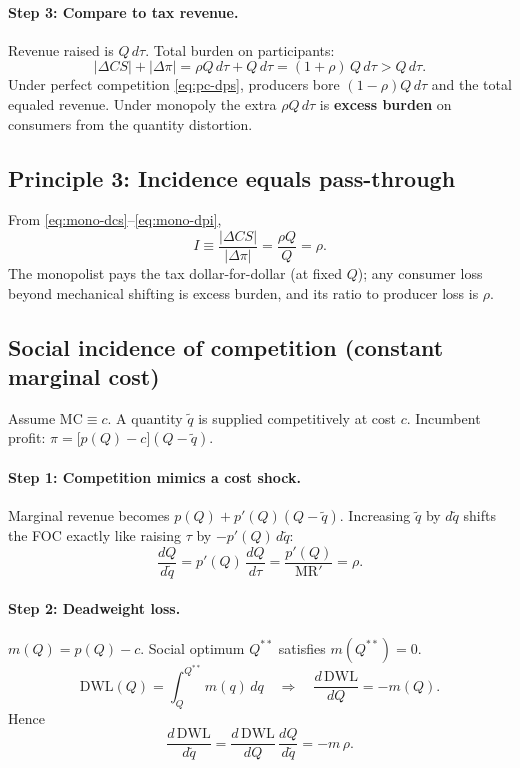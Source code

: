 \documentclass[11pt]{article}
\begin{document}
\paragraph{Step 3: Compare to tax revenue.}
Revenue raised is $Q\,d\tau$.  Total burden on participants:
\[
  |\Delta CS| + |\Delta\pi|
  = \rho Q\,d\tau + Q\,d\tau
  = (1+\rho)\,Q\,d\tau
  > Q\,d\tau.
\]
Under perfect competition \eqref{eq:pc-dps}, producers bore
$(1-\rho)Q\,d\tau$ and the total equaled revenue.  Under monopoly the
extra $\rho Q\,d\tau$ is \textbf{excess burden} on consumers from the
quantity distortion.

\subsection{Principle 3: Incidence equals pass-through}

From \eqref{eq:mono-dcs}--\eqref{eq:mono-dpi},
\[
  I \equiv \frac{|\Delta CS|}{|\Delta\pi|}
  = \frac{\rho Q}{Q}
  = \rho.
\]
The monopolist pays the tax dollar-for-dollar (at fixed $Q$); any consumer
loss beyond mechanical shifting is excess burden, and its ratio to producer
loss is $\rho$.

\subsection{Social incidence of competition (constant marginal cost)}

Assume $\mathrm{MC} \equiv c$.  A quantity $\tilde q$ is supplied
competitively at cost $c$.  Incumbent profit:
$\pi = \bigl[p(Q) - c\bigr](Q - \tilde q)$.

\paragraph{Step 1: Competition mimics a cost shock.}
Marginal revenue becomes $p(Q) + p'(Q)(Q - \tilde q)$.  Increasing
$\tilde q$ by $d\tilde q$ shifts the FOC exactly like raising $\tau$ by
$-p'(Q)\,d\tilde q$:
\[
  \frac{dQ}{d\tilde q} = p'(Q)\,\frac{dQ}{d\tau}
  = \frac{p'(Q)}{\mathrm{MR}'} = \rho.
\]

\paragraph{Step 2: Deadweight loss.}
$m(Q) = p(Q) - c$.  Social optimum $Q^{**}$ satisfies $m(Q^{**}) = 0$.
\[
  \mathrm{DWL}(Q) = \int_Q^{Q^{**}} m(q)\,dq
  \quad\Rightarrow\quad
  \frac{d\,\mathrm{DWL}}{dQ} = -m(Q).
\]
Hence
\[
  \frac{d\,\mathrm{DWL}}{d\tilde q}
  = \frac{d\,\mathrm{DWL}}{dQ}\,\frac{dQ}{d\tilde q}
  = -m\,\rho.
\]
\end{document}
